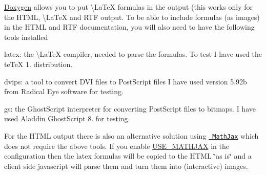 \mbox{\hyperlink{class_doxygen}{Doxygen}} allows you to put \textbackslash{}\+La\+TeX formulas in the output (this works only for the H\+T\+ML, \textbackslash{}\+La\+TeX and R\+TF output. To be able to include formulas (as images) in the H\+T\+ML and R\+TF documentation, you will also need to have the following tools installed 
\begin{DoxyItemize}
\item {\ttfamily latex\+:} the \textbackslash{}\+La\+TeX compiler, needed to parse the formulas. To test I have used the te\+TeX 1. distribution. 
\item {\ttfamily dvips\+:} a tool to convert D\+VI files to Post\+Script files I have used version 5.\+92b from Radical Eye software for testing. 
\item {\ttfamily gs\+:} the Ghost\+Script interpreter for converting Post\+Script files to bitmaps. I have used Aladdin Ghost\+Script 8. for testing. 
\end{DoxyItemize}For the H\+T\+ML output there is also an alternative solution using \href{https://www.mathjax.org}{\texttt{ Math\+Jax}} which does not require the above tools. If you enable \mbox{\hyperlink{config_cfg_use_mathjax}{U\+S\+E\+\_\+\+M\+A\+T\+H\+J\+AX}} in the configuration then the latex formulas will be copied to the H\+T\+ML \char`\"{}as is\char`\"{} and a client side javascript will parse them and turn them into (interactive) images.

